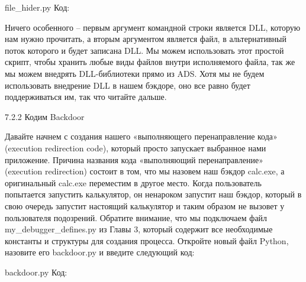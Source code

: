 \documentclass[12pt]{book}
\begin{document}
file\_hider.py
Код:



Ничего особенного – первым аргумент командной строки является DLL, которую нам нужно прочитать, а вторым аргументом является файл, в альтернативный поток которого и будет записана DLL. Мы можем использовать этот простой скрипт, чтобы хранить любые виды файлов внутри исполняемого файла, так же мы можем внедрять DLL-библиотеки прямо из ADS. Хотя мы не будем использовать внедрение DLL в нашем бэкдоре, оно все равно будет поддерживаться им, так что читайте дальше. 

7.2.2 Кодим Backdoor

Давайте начнем с создания нашего «выполняющего перенаправление кода» (execution redirection code), который просто запускает выбранное нами приложение. Причина названия кода «выполняющий перенаправление» (execution redirection) состоит в том, что мы назовем наш бэкдор calc.exe, а оригинальный calc.exe переместим в другое место. Когда пользователь попытается запустить калькулятор, он ненароком запустит наш бэкдор, который в свою очередь запустит настоящий калькулятор и таким образом не вызовет у пользователя подозрений. Обратите внимание, что мы подключаем файл my\_debugger\_defines.py из Главы 3, который содержит все необходимые константы и структуры для создания процесса. Откройте новый файл Python, назовите его backdoor.py и введите следующий код:

backdoor.py
Код:





\end{document}
